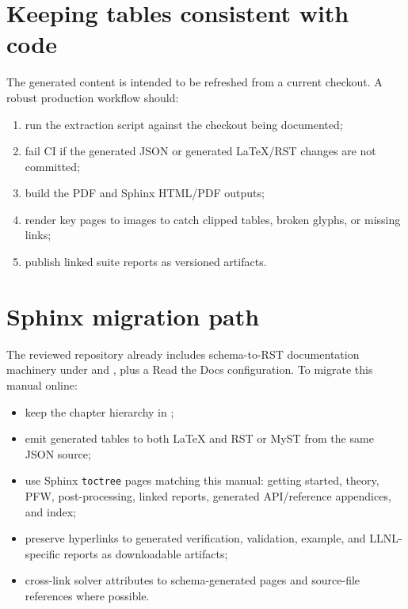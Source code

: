 \section{Keeping tables consistent with code}
The generated content is intended to be refreshed from a current checkout.  A robust production workflow should:
\begin{enumerate}[leftmargin=*]
\item run the extraction script against the checkout being documented;
\item fail CI if the generated JSON or generated \LaTeX/RST changes are not committed;
\item build the PDF and Sphinx HTML/PDF outputs;
\item render key pages to images to catch clipped tables, broken glyphs, or missing links;
\item publish linked suite reports as versioned artifacts.
\end{enumerate}

\section{Sphinx migration path}
The reviewed repository already includes schema-to-RST documentation machinery under  and , plus a Read the Docs configuration.  To migrate this manual online:
\begin{itemize}[leftmargin=*]
\item keep the chapter hierarchy in ;
\item emit generated tables to both \LaTeX{} and RST or MyST from the same JSON source;
\item use Sphinx \texttt{toctree} pages matching this manual: getting started, theory, PFW, post-processing, linked reports, generated API/reference appendices, and index;
\item preserve hyperlinks to generated verification, validation, example, and LLNL-specific reports as downloadable artifacts;
\item cross-link solver attributes to schema-generated pages and source-file references where possible.
\end{itemize}
